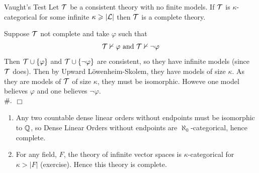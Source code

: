 \documentclass{article}
\numberwithin{thm}{subsection}
\begin{document}
\begin{fancyprop}{Vaught's Test}
Let $\mathcal{T}$ be a consistent theory with no finite models. If $\mathcal{T}$ is $\kappa$-categorical for some infinite $\kappa \geqslant |\mathcal{L}|$ then $\mathcal{T}$ is a complete theory.
\end{fancyprop}
\proof Suppose $\mathcal{T}$ not complete and take $\varphi$ such that \[
\mathcal{T} \nvdash \varphi \text{  and  } \mathcal{T} \nvdash \neg \varphi\]
Then $\mathcal{T} \cup \{\varphi\}$ and $\mathcal{T} \cup \{\neg\varphi\}$ are consistent, so they have infinite models (since $\mathcal{T}$ does). Then by Upward L\"owenheim-Skolem, they have models of size $\kappa$. As they are models of $\mathcal{T}$ of size $\kappa$, they must be isomorphic. Howeve one model believes $\varphi$ and one believes $\neg\varphi$.\\ \flushright $\#.$ $ \Box$ \flushleft
\exs \hspace{0.1cm}
\begin{enumerate}
    \item Any two countable dense linear orders without endpoints must be isomorphic to $\mathbb{Q}$, so Dense Linear Orders without endpoints are $\aleph_{0}$-categorical, hence complete.
    \item For any field, $F$, the theory of infinite vector spaces is $\kappa$-categorical for $\kappa> |F| $ (exercise). Hence this theory is complete.
\end{enumerate}
\end{document}
